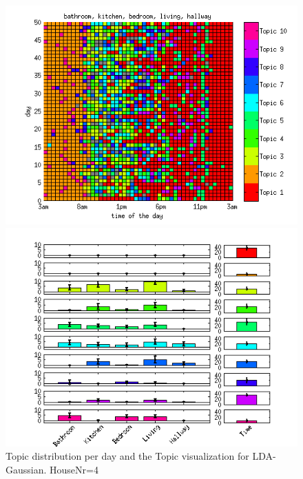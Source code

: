 \begin{figure}
 \centering
 \begin{minipage}[b]{0.45\linewidth}
  \centering
  \includegraphics[width=\textwidth]{Pictures/Gaus/DayHN4TS48k20.png}
 \end{minipage}
 \begin{minipage}[b]{0.45\linewidth}
  \centering
  \includegraphics[width=\textwidth]{Pictures/Gaus/TopHN4TS48k20.png}
 \end{minipage}
 \caption{Topic distribution per day and the Topic visualization for LDA-Gaussian. HouseNr=4}
\end{figure}

